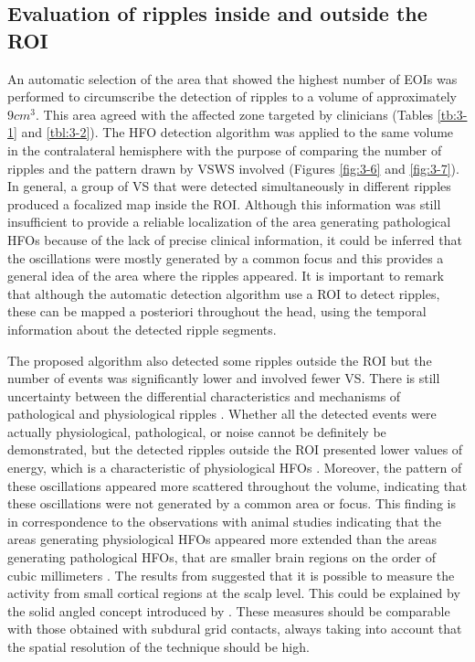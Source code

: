 \subsection{Evaluation of ripples inside and outside the ROI}

An automatic selection of the area that showed the highest number of EOIs was performed to circumscribe the detection of ripples to a volume of approximately $9 cm^3$. This area agreed with the affected zone targeted by clinicians (Tables \ref{tb:3-1} and \ref{tbl:3-2}). The HFO detection algorithm was applied to the same volume in the contralateral hemisphere with the purpose of comparing the number of ripples and the pattern drawn by VSWS involved (Figures \ref{fig:3-6} and \ref{fig:3-7}). In general, a group of VS that were detected simultaneously in different ripples produced a focalized map inside the ROI. Although this information was still insufficient to provide a reliable localization of the area generating pathological HFOs because of the lack of precise clinical information, it could be inferred that the oscillations were mostly generated by a common focus and this provides a general idea of the area where the ripples appeared. It is important to remark that although the automatic detection algorithm use a ROI to detect ripples, these can be mapped a posteriori throughout the head, using the temporal information about the detected ripple segments.

The proposed algorithm also detected some ripples outside the ROI but the number of events was significantly lower and involved fewer VS. There is still uncertainty between the differential characteristics and mechanisms of pathological and physiological ripples \citep{Jefferys2012}. Whether all the detected events were actually physiological, pathological, or noise cannot be definitely be demonstrated, but the detected ripples outside the ROI presented lower values of energy, which is a characteristic of physiological HFOs \citep{Matsumoto2013}. Moreover, the pattern of these oscillations appeared more scattered throughout the volume, indicating that these oscillations were not generated by a common area or focus. This finding is in correspondence to the observations with animal studies indicating that the areas generating physiological HFOs appeared more extended \citep{Chrobak1996} than the areas generating pathological HFOs, that are smaller brain regions on the order of cubic millimeters \citep{Bragin2002}. The results from \citet{Zelmann2014} suggested that it is possible to measure the activity from small cortical regions at the scalp level. This could be explained by the solid angled concept introduced by \citet{Gloor1985}. These measures should be comparable with those obtained with subdural grid contacts, always taking into account that the spatial resolution of the technique should be high.


